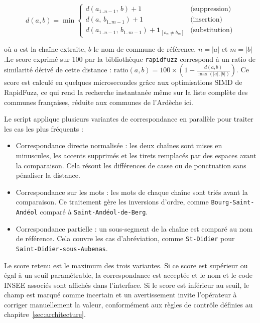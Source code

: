 \begin{equation}
  d(a, b) = \min
  \begin{cases}
    d(a_{1..n-1},\, b) + 1 & \text{(suppression)} \\
    d(a,\, b_{1..m-1}) + 1 & \text{(insertion)} \\
    d(a_{1..n-1},\, b_{1..m-1}) + \mathbf{1}_{[a_n \neq b_m]} & \text{(substitution)}
  \end{cases}
\end{equation}

où $a$ est la chaîne extraite, $b$ le nom de commune de référence, $n = |a|$ et $m = |b|$.Le score exprimé sur 100 par la bibliothèque \texttt{rapidfuzz} correspond à un ratio de similarité dérivé de cette distance : $\text{ratio}(a, b) = 100 \times \left(1 - \frac{d(a,b)}{\max(|a|,|b|)}\right)$. Ce score est calculé en quelques microsecondes grâce aux optimisations SIMD de RapidFuzz, ce qui rend la recherche instantanée même sur la liste complète des communes françaises, réduite aux communes de l'Ardèche ici.

Le script applique plusieurs variantes de correspondance en parallèle pour traiter les cas les plus fréquents :

\begin{itemize}
  \item Correspondance directe normalisée : les deux chaînes sont mises en minuscules, les accents supprimés et les tirets remplacés par des espaces avant la comparaison. Cela résout les différences de casse ou de ponctuation sans pénaliser la distance.
  \item Correspondance sur les mots : les mots de chaque chaîne sont triés avant la comparaison. Ce traitement gère les inversions d'ordre, comme \texttt{Bourg-Saint-Andéol} comparé à \texttt{Saint-Andéol-de-Berg}.
  \item Correspondance partielle : un sous-segment de la chaîne est comparé au nom de référence. Cela couvre les cas d'abréviation, comme \texttt{St-Didier} pour \texttt{Saint-Didier-sous-Aubenas}.
\end{itemize}

Le score retenu est le maximum des trois variantes. Si ce score est supérieur ou égal à un seuil paramétrable, la correspondance est acceptée et le nom et le code INSEE associés sont affichés dans l'interface. Si le score est inférieur au seuil, le champ est marqué comme incertain et un avertissement invite l'opérateur à corriger manuellement la valeur, conformément aux règles de contrôle définies au chapitre~\ref{sec:architecture}.

